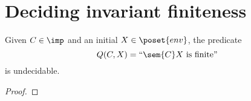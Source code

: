 \section{Deciding invariant finiteness}

\begin{lemma}\label{le:finiteness}
  Given \(C\in\imp\) and an initial \(X \in \poset{env}\), the
  predicate \[Q(C,X)= ``\sem{C}X \text{ is finite}" \] is
  undecidable.
\end{lemma}

\begin{proof}
  
\end{proof}
